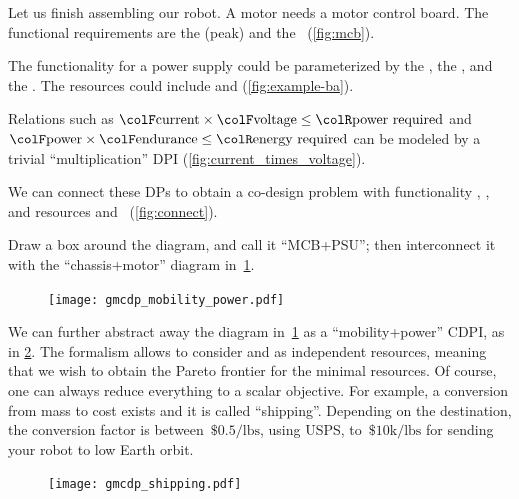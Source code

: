 \begin{example}

\label{exa:finish}Let us finish assembling our robot. A motor needs
a motor control board. The functional requirements are the (peak)
 and the ~(\cref{fig:mcb}).


\noindent The functionality for a power supply could be parameterized
by the , the , and the .
The resources could include  and  (\cref{fig:example-ba}).


\noindent 

\noindent Relations such as ${\colF\mbox{current}}\times{\colF\mbox{voltage}}\leq{\colR\mbox{power required}}$
and ${\colF\mbox{power}}\times{\colF\mbox{endurance}}\leq{\colR\mbox{energy required}}$
can be modeled by a trivial ``multiplication'' DPI (\cref{fig:current_times_voltage}).


\noindent We can connect these DPs to obtain a co-design problem with
functionality , ,  and resources
 and ~(\cref{fig:connect}).


\noindent Draw a box around the diagram, and call it ``MCB+PSU'';
then interconnect it with the ``chassis+motor'' diagram in~\cref{fig:another}.

\noindent 
\begin{figure}[h]
\begin{centering}
\texttt{[image: gmcdp\_mobility\_power.pdf]}
\par\end{centering}
\caption{\label{fig:another}}
\end{figure}

We can further abstract away the diagram in~\cref{fig:another} as
a ``mobility+power'' CDPI, as in \cref{fig:shipping}. The formalism
allows to consider  and  as independent resources,
meaning that we wish to obtain the Pareto frontier for the minimal
resources. Of course, one can always reduce everything to a scalar
objective. For example, a conversion from mass to cost exists and
it is called ``shipping''. Depending on the destination, the conversion
factor is between~$\$0.5/\mbox{lbs}$, using USPS, to~$\$10\mbox{k}/\mbox{lbs}$
for sending your robot to low Earth orbit. 

\noindent 
\begin{figure}[h]
\centering{}\texttt{[image: gmcdp\_shipping.pdf]}\caption{\label{fig:shipping}}
\end{figure}

\end{example}